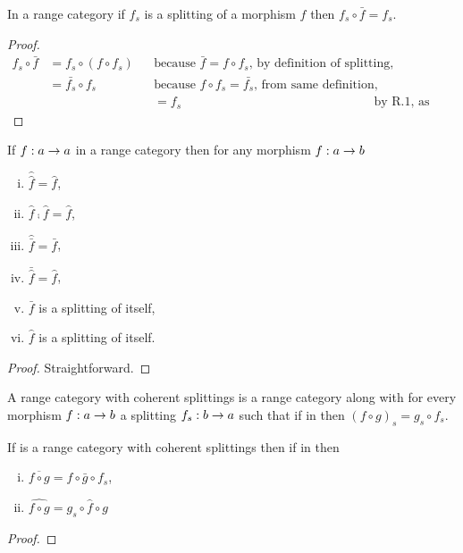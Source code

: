 \documentclass[10pt,a4paper]{article}
\theoremstyle{remark}
\begin{document}
\begin{lemma}
\label{jsbarj}
In a range category \catcw if $f_s$ is a splitting of a morphism $f$ 
then $f_s \circ \bar{f} = f_s.$
\end{lemma}
\begin{proof}
\begin{align*}
f_s \circ \bar{f} 
      &= f_s \circ (f \circ f_s) 
             && \mbox{because $\bar{f}=f \circ f_s$, by definition of splitting, } \\
      &= \bar{f_s} \circ f_s     
             && \mbox{because $f \circ f_s = \bar{f_s}$, from same definition,}    \\
             && 
      &= f_s   &&\mbox{by R.1, as required.}
\end{align*}
\end{proof}

\begin{lemma}
If $f:a \rightarrow a$ in a range category \catcw then for any morphism 
$f: a \rightarrow b$
\begin{enumerate}[(i)] 
\item $\hat{\hat{f}}=\hat{f}$,
\item $\hat{f} \comp \hat{f} = \hat{f}$,
\item $\hat{\bar{f}}=\bar{f}$,
\item $\bar{\hat{f}}=\hat{f}$,
\item $\bar{f}$ is a splitting of itself,
\item $\hat{f}$ is a splitting of itself.
\end{enumerate}
\end{lemma}
\begin{proof}
Straightforward.
\end{proof}

\begin{definition}
A range category with coherent splittings is a range category \catcw along with for every
morphism $f:a \rightarrow b$ a splitting $f_s:b \rightarrow a$ such that if
 in \catcw then $(f \circ g)_s=g_s \circ f_s$.
\end{definition}

\begin{lemma}
\label{splittingsequencepair}
If \catcw is a range category with coherent splittings then if
 in \catcw
 then 
 \begin{enumerate}[(i)]
 \item $\overline{f \circ g}=f \circ \bar{g} \circ f_s$,
 \item $\widehat{f \circ g}=g_s\circ \hat{f} \circ g$
\end{enumerate}
 \end{lemma}
\begin{proof}
\end{proof}
\end{document}
